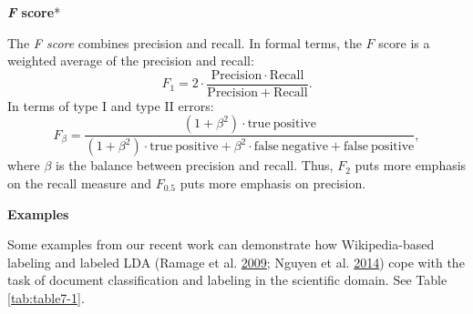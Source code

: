 \documentclass[]{krantz}
\begin{document}
\textbf{\emph{F} score}*

The \emph{F score} combines precision and recall. In formal terms, the
\(F\) score is a weighted average of the precision and recall:
\[\label{eq:text:F1}
F_1 = 2\cdot \frac{\mathrm{Precision}\cdot \mathrm{Recall}}{\mathrm{Precision}+\mathrm{Recall}}.\]
In terms of type I and type II errors:
\[F_\beta = \frac{(1+\beta^2)\cdot \mathrm{true\ positive}}{(1+\beta^2)\cdot \mathrm{true\ positive} + \beta^2\cdot \mathrm{false\ negative} + \mathrm{false\ positive}},\]
where \(\beta\) is the balance between precision and recall. Thus,
\(F_2\) puts more emphasis on the recall measure and \(F_{0.5}\) puts
more emphasis on precision.

\textbf{Examples}

Some examples from our recent work can demonstrate how Wikipedia-based
labeling and labeled LDA (Ramage et al.
\protect\hyperlink{ref-ramage-09}{2009}; Nguyen et al.
\protect\hyperlink{ref-Nguyen:Boyd-Graber:Resnik:Chang-2014}{2014}) cope
with the task of document classification and labeling in the scientific
domain. See Table \ref{tab:table7-1}.
\end{document}
